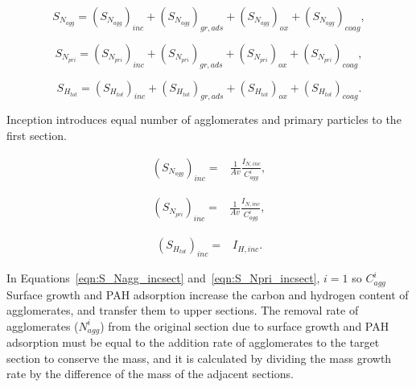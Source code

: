 \begin{equation}
	S_{N_{agg}} = 
	\left(S_{N_{agg}}\right)_{inc}
	+\left(S_{N_{agg}}\right)_{gr, ads}
	+\left(S_{N_{agg}}\right)_{ox}
	+\left(S_{N_{agg}}\right)_{coag}
	\label{eqn:S_Naggsect},
\end{equation}

\begin{equation}
	S_{N_{pri}} = 
	\left(S_{N_{pri}}\right)_{inc}
	+\left(S_{N_{pri}}\right)_{gr, ads}
	+\left(S_{N_{pri}}\right)_{ox}
	+\left(S_{N_{pri}}\right)_{coag}
	\label{eqn:S_Nprisect},
\end{equation}

\begin{equation}
	S_{H_{tot}} = 
	\left(S_{H_{tot}}\right)_{inc}
	+\left(S_{H_{tot}}\right)_{gr, ads}
	+\left(S_{H_{tot}}\right)_{ox}
	+\left(S_{H_{tot}}\right)_{coag}
	\label{eqn:S_Htotsect}.
\end{equation}

 Inception introduces equal number of agglomerates and primary particles to the first section.

\begin{equation}
	\begin{aligned}
	\left(S_{N_{agg}}\right)_{inc} =
	&\frac{1}{Av}\frac{I_{N, inc}}{C^i_{agg}},
	\end{aligned}
	\label{eqn:S_Nagg_incsect}
\end{equation}

\begin{equation}
	\begin{aligned}
	\left(S_{N_{pri}}\right)_{inc} =
	&\frac{1}{Av}\frac{I_{N, inc}}{C^i_{agg}},
	\end{aligned}
	\label{eqn:S_Npri_incsect}
\end{equation}

\begin{equation}
	\begin{aligned}
		\left(S_{H_{tot}}\right)_{inc} =
		&I_{H, inc}.
	\end{aligned}
	\label{eqn:S_Htot_incsect}
\end{equation}

In Equations~\ref{eqn:S_Nagg_incsect} and~\ref{eqn:S_Npri_incsect}, $i=1$ so $C^i_{agg}$  Surface growth and PAH adsorption increase the carbon and hydrogen content of agglomerates, and transfer them to upper sections. The removal rate of agglomerates (${N^i_{agg}}$) from the original section due to surface growth and PAH adsorption must be equal to the addition rate of agglomerates to the target section to conserve the mass, and it is calculated by dividing the mass growth rate by the difference of the mass of the adjacent sections.

